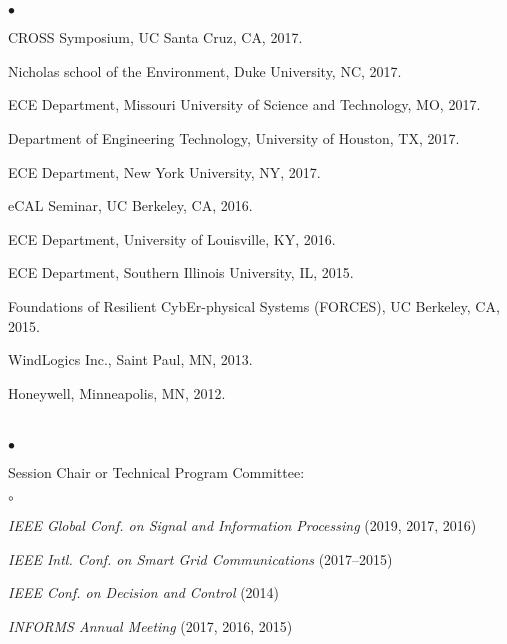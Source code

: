 \documentclass[margin,line]{res}
\newenvironment{list2}{
  \begin{list}{$\bullet$}{%
      \setlength{\itemsep}{0in}
      \setlength{\parsep}{0in} \setlength{\parskip}{0in}
      \setlength{\topsep}{0in} \setlength{\partopsep}{0in}
      \setlength{\leftmargin}{0.10in}}}{\end{list}}
\newenvironment{list3}{
  \begin{list}{$\circ$}{%
      \setlength{\itemsep}{0in}
      \setlength{\parsep}{0in} \setlength{\parskip}{0in}
      \setlength{\topsep}{0in} \setlength{\partopsep}{0in}
      \setlength{\leftmargin}{0.28in}}}{\end{list}}
\begin{document}
\begin{resume}
\vspace{.3cm}


\section{}

\vspace{.2cm}

\begin{list2}

\item   CROSS Symposium, UC Santa Cruz, CA, 2017. 
\item   Nicholas school of the Environment, Duke University, NC, 2017.
\item   ECE Department, Missouri University of Science and Technology, MO, 2017.
\item   Department of Engineering Technology, University of Houston, TX, 2017.
\item   ECE Department, New York University, NY, 2017.   
\item   eCAL Seminar, UC Berkeley, CA, 2016.
\item   ECE Department, University of Louisville, KY, 2016.            
\item   ECE Department, Southern Illinois University, IL, 2015.
\item   Foundations of Resilient CybEr-physical Systems (FORCES), UC Berkeley, CA, 2015.
\item   WindLogics Inc., Saint Paul, MN, 2013.
\item   Honeywell, Minneapolis, MN, 2012.
\end{list2}

\vspace{.3cm}



\section{}
\begin{list2}


\item Session Chair or Technical Program Committee:
\begin{list3}
\item \emph{IEEE Global Conf. on Signal and Information Processing} (2019, 2017, 2016)
\item \emph{IEEE Intl. Conf.  on Smart Grid Communications} (2017--2015)
\item \emph{IEEE Conf.  on Decision and Control}  (2014)
\item \emph{INFORMS Annual Meeting} (2017, 2016, 2015)
\end{list3}
\vspace{4mm}


\end{list2}
\end{resume}
\end{document}
